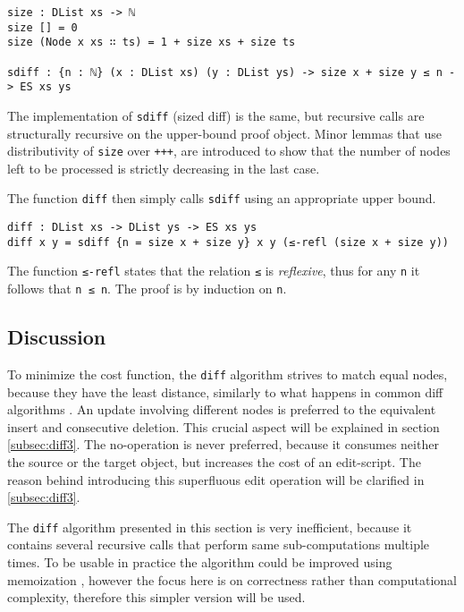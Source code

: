 \documentclass[../Thesis.tex]{subfiles}
\begin{document}
\begin{verbatim}
size : DList xs -> ℕ 
size [] = 0
size (Node x xs ∷ ts) = 1 + size xs + size ts

sdiff : {n : ℕ} (x : DList xs) (y : DList ys) -> size x + size y ≤ n -> ES xs ys
\end{verbatim}
	
	The implementation of \texttt{sdiff} (sized diff) is the same, but recursive 
	calls	are structurally recursive on the upper-bound proof object.
	Minor lemmas that use distributivity of \texttt{size} over \texttt{+++},
	are introduced to show that the number of nodes left to be processed
	is strictly decreasing in the last case.

	The function \texttt{diff} then simply calls \texttt{sdiff} using an appropriate
	upper bound.
		
\begin{verbatim}
diff : DList xs -> DList ys -> ES xs ys
diff x y = sdiff {n = size x + size y} x y (≤-refl (size x + size y))
\end{verbatim}

	The function \texttt{≤-refl} states that the relation \texttt{≤} is 
	\emph{reflexive}, thus for any \texttt{n} it follows that \texttt{n ≤ n}.
	The proof is by induction on \texttt{n}.	 
	
	\subsection{Discussion}
	To minimize the cost function, the \texttt{diff} algorithm strives to 
	match equal nodes, because they have the least distance, similarly to 
	what happens in common diff algorithms \cite{Lemp09}.
	An update involving different nodes is preferred to the equivalent 
	insert and consecutive deletion. This crucial aspect will be explained
	in section \ref{subsec:diff3}.
	The no-operation is never preferred, because it consumes neither the
	source or the target object, but increases the cost of an edit-script.
	The reason behind introducing this superfluous edit operation	will be 
	clarified in \ref{subsec:diff3}.

	The \texttt{diff} algorithm presented in this section is very inefficient,
	because it contains several recursive calls that perform same 
	sub-computations multiple times. 
	To be usable in practice the algorithm could be improved using 
	memoization \cite{Lemp09}, however the focus here is on correctness 
	rather than computational complexity, therefore this simpler version will
	be used.
\end{document}
